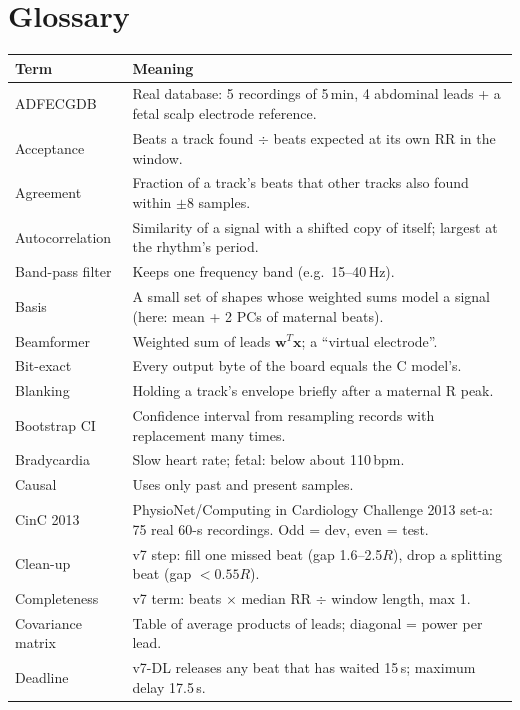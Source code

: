 \documentclass[11pt]{article}
\begin{document}
\section{Glossary}
\label{sec:glossary}
\begin{center}
\small
\begin{longtable}{p{3.6cm}p{11.6cm}}
\toprule
\textbf{Term} & \textbf{Meaning} \\
\midrule
\endhead
ADFECGDB & Real database: 5 recordings of 5\,min, 4 abdominal leads + a fetal scalp electrode reference. \\
Acceptance & Beats a track found $\div$ beats expected at its own RR in the window. \\
Agreement & Fraction of a track's beats that other tracks also found within $\pm 8$ samples. \\
Autocorrelation & Similarity of a signal with a shifted copy of itself; largest at the rhythm's period. \\
Band-pass filter & Keeps one frequency band (e.g.\ 15--40\,Hz). \\
Basis & A small set of shapes whose weighted sums model a signal (here: mean + 2 PCs of maternal beats). \\
Beamformer & Weighted sum of leads $\mathbf{w}^T\mathbf{x}$; a ``virtual electrode''. \\
Bit-exact & Every output byte of the board equals the C model's. \\
Blanking & Holding a track's envelope briefly after a maternal R peak. \\
Bootstrap CI & Confidence interval from resampling records with replacement many times. \\
Bradycardia & Slow heart rate; fetal: below about 110\,bpm. \\
Causal & Uses only past and present samples. \\
CinC 2013 & PhysioNet/Computing in Cardiology Challenge 2013 set-a: 75 real 60-s recordings. Odd = dev, even = test. \\
Clean-up & v7 step: fill one missed beat (gap 1.6--2.5$R$), drop a splitting beat (gap $<0.55R$). \\
Completeness & v7 term: beats $\times$ median RR $\div$ window length, max 1. \\
Covariance matrix & Table of average products of leads; diagonal = power per lead. \\
Deadline & v7-DL releases any beat that has waited 15\,s; maximum delay 17.5\,s. \\

\end{longtable}
\end{center}
\end{document}
